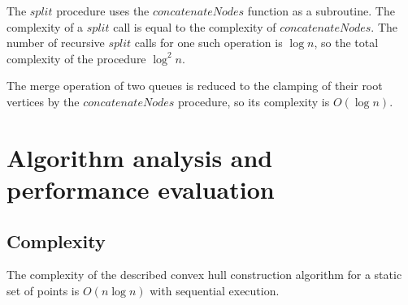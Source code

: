 \documentclass[a4paper,english,numberwithinsect,notab]{eurocg20-submission}
\begin{document}
	The $split$ procedure uses the $concatenateNodes$ function as a subroutine. The complexity of a $split$ call is equal to the complexity of $concatenateNodes$. The number of recursive $split$ calls for one such operation is $\log n$, so the total complexity of the procedure $\log^2 n$.
	
	The merge operation of two queues is reduced to the clamping of their root vertices by the $concatenateNodes$ procedure, so its complexity is $O(\log n)$.


\section{Algorithm analysis and performance evaluation}
\label{sec:algorithm-analysis-and-performance-evaluation}
\subsection{Complexity}



	\begin{theorem}
		The complexity of the described convex hull construction algorithm for a static set of points is $O(n\log n)$ with sequential execution.
	\end{theorem}
	
\end{document}
